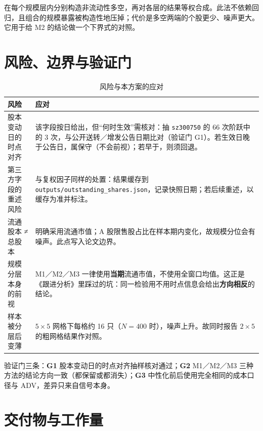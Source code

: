\documentclass[11pt,a4paper]{ctexart}
\begin{document}
在每个规模层内分别构造非流动性多空，再对各层的结果等权合成。此法不依赖回归，且组合的规模暴露被构造性地压掉；代价是多空两端的个股更少、噪声更大。它用于给 M2 的结论做一个下界式的对照。

\section{风险、边界与验证门}

\begin{table}[htbp]
\centering
\caption{风险与本方案的应对}
\label{tab:risks}
\begin{tabular}{@{}>{\raggedright\arraybackslash}p{4.4cm}>{\raggedright\arraybackslash}p{10.0cm}@{}}
\toprule
风险 & 应对 \\
\midrule
股本变动日的时点对齐 & 该字段按日给出，但“何时生效”需核对：抽 \texttt{sz300750} 的 66 次阶跃中的 3 次，与公开送转／增发公告日期比对（验证门 G1）。若生效日晚于公告日，属保守（不会前视）；若早于，则须回退。 \\
\addlinespace
第三方字段的重述风险 & 与复权因子同样的处置：结果缓存到 \texttt{outputs/outstanding\_shares.json}，记录快照日期；若后续重述，以缓存为准并标注。 \\
\addlinespace
流通股本 ≠ 总股本 & 明确采用流通市值；A 股限售股占比在样本期内变化，故规模分位会有噪声。此点写入论文边界。 \\
\addlinespace
规模分层本身的前视 & M1／M2／M3 一律使用\textbf{当期}流通市值，不使用全窗口均值。这正是《跟进分析》里踩过的坑：同一检验用不用时点信息会给出\textbf{方向相反}的结论。 \\
\addlinespace
样本被分层后变薄 & $5\times5$ 网格下每格约 16 只（$N=400$ 时），噪声上升。故同时报告 $2\times5$ 的粗网格结果作对照。 \\
\bottomrule
\end{tabular}
\end{table}

验证门三条：\textbf{G1} 股本变动日的时点对齐抽样核对通过；\textbf{G2} M1／M2／M3 三种方法的结论方向一致（都保留或都消失）；\textbf{G3} 中性化前后使用完全相同的成本口径与 ADV，差异只来自信号本身。

\section{交付物与工作量}
\end{document}
